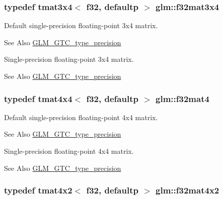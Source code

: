 \hypertarget{group__gtc__type__precision_ga9995b357aa1e9603adad780cfde1aa07}{
\subsubsection[{f32mat3x4}]{\setlength{\rightskip}{0pt plus 5cm}typedef tmat3x4$<$ f32, defaultp $>$ {\bf glm\-::f32mat3x4}}}\label{group__gtc__type__precision_ga9995b357aa1e9603adad780cfde1aa07}
Default single-\/precision floating-\/point 3x4 matrix. \begin{DoxySeeAlso}{See Also}
\hyperlink{group__gtc__type__precision}{G\-L\-M\-\_\-\-G\-T\-C\-\_\-type\-\_\-precision}
\end{DoxySeeAlso}
Single-\/precision floating-\/point 3x4 matrix. \begin{DoxySeeAlso}{See Also}
\hyperlink{group__gtc__type__precision}{G\-L\-M\-\_\-\-G\-T\-C\-\_\-type\-\_\-precision} 
\end{DoxySeeAlso}
\hypertarget{group__gtc__type__precision_ga47bc5ddfbd368423c9b762c03ba7e77f}{
\subsubsection[{f32mat4}]{\setlength{\rightskip}{0pt plus 5cm}typedef tmat4x4$<$ f32, defaultp $>$ {\bf glm\-::f32mat4}}}\label{group__gtc__type__precision_ga47bc5ddfbd368423c9b762c03ba7e77f}
Default single-\/precision floating-\/point 4x4 matrix. \begin{DoxySeeAlso}{See Also}
\hyperlink{group__gtc__type__precision}{G\-L\-M\-\_\-\-G\-T\-C\-\_\-type\-\_\-precision}
\end{DoxySeeAlso}
Single-\/precision floating-\/point 4x4 matrix. \begin{DoxySeeAlso}{See Also}
\hyperlink{group__gtc__type__precision}{G\-L\-M\-\_\-\-G\-T\-C\-\_\-type\-\_\-precision} 
\end{DoxySeeAlso}
\hypertarget{group__gtc__type__precision_gab531a3d0479121732ae090254e0bd58f}{
\subsubsection[{f32mat4x2}]{\setlength{\rightskip}{0pt plus 5cm}typedef tmat4x2$<$ f32, defaultp $>$ {\bf glm\-::f32mat4x2}}}\label{group__gtc__type__precision_gab531a3d0479121732ae090254e0bd58f}
